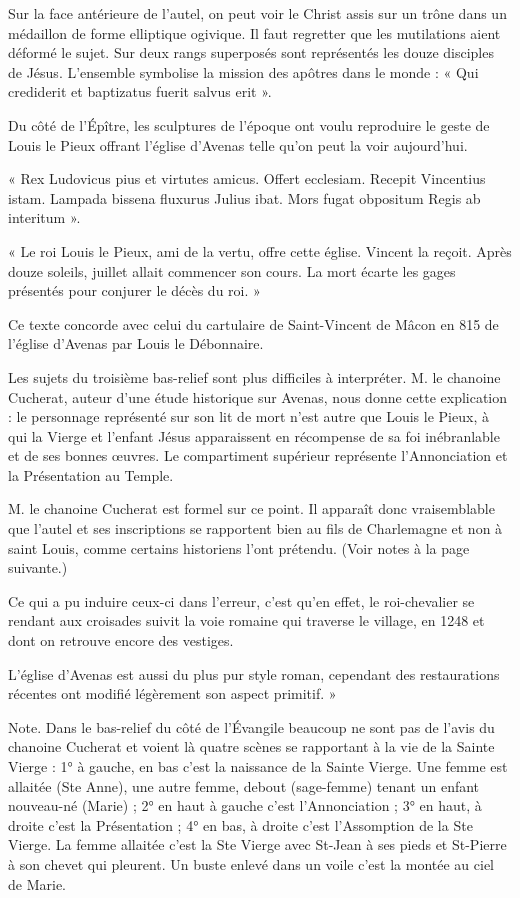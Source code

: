 Sur la face antérieure de l'autel, on peut voir le Christ assis sur un trône dans un médaillon de forme elliptique ogivique. Il faut regretter que les mutilations aient déformé le sujet. Sur deux rangs superposés sont représentés les douze disciples de Jésus. L'ensemble symbolise la mission des apôtres dans le monde : « Qui crediderit et baptizatus fuerit salvus erit ».

Du côté de l'Épître, les sculptures de l'époque ont voulu reproduire le geste de Louis le Pieux offrant l'église d'Avenas telle qu'on peut la voir aujourd'hui.

« Rex Ludovicus pius et virtutes amicus. Offert ecclesiam. Recepit Vincentius istam. Lampada bissena fluxurus Julius ibat. Mors fugat obpositum Regis ab interitum ».

« Le roi Louis le Pieux, ami de la vertu, offre cette église. Vincent la reçoit. Après douze soleils, juillet allait commencer son cours. La mort écarte les gages présentés pour conjurer le décès du roi. »

Ce texte concorde avec celui du cartulaire de Saint-Vincent de Mâcon en 815 de l'église d'Avenas par Louis le Débonnaire.

Les sujets du troisième bas-relief sont plus difficiles à interpréter. M. le chanoine Cucherat, auteur d'une étude historique sur Avenas, nous donne cette explication : le personnage représenté sur son lit de mort n'est autre que Louis le Pieux, à qui la Vierge et l'enfant Jésus apparaissent en récompense de sa foi inébranlable et de ses bonnes œuvres. Le compartiment supérieur représente l'Annonciation et la Présentation au Temple.

M. le chanoine Cucherat est formel sur ce point. Il apparaît donc vraisemblable que l'autel et ses inscriptions se rapportent bien au fils de Charlemagne et non à saint Louis, comme certains historiens l'ont prétendu. (Voir notes à la page suivante.)

Ce qui a pu induire ceux-ci dans l'erreur, c'est qu'en effet, le roi-chevalier se rendant aux croisades suivit la voie romaine qui traverse le village, en 1248 et dont on retrouve encore des vestiges.

L'église d'Avenas est aussi du plus pur style roman, cependant des restaurations récentes ont modifié légèrement son aspect primitif. »

Note. Dans le bas-relief du côté de l'Évangile beaucoup ne sont pas de l'avis du chanoine Cucherat et voient là quatre scènes se rapportant à la vie de la Sainte Vierge : 1° à gauche, en bas c'est la naissance de la Sainte Vierge. Une femme est allaitée (Ste Anne), une autre femme, debout (sage-femme) tenant un enfant nouveau-né (Marie) ; 2° en haut à gauche c'est l'Annonciation ; 3° en haut, à droite c'est la Présentation ; 4° en bas, à droite c'est l'Assomption de la Ste Vierge. La femme allaitée c'est la Ste Vierge avec St-Jean à ses pieds et St-Pierre à son chevet qui pleurent. Un buste enlevé dans un voile c'est la montée au ciel de Marie.

